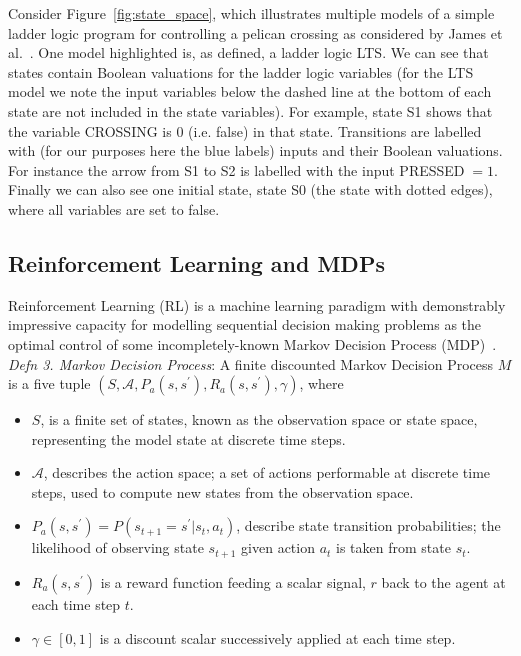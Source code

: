 \documentclass[runningheads]{llncs}
\begin{document}
Consider Figure~\ref{fig:state_space}, which illustrates multiple models of a simple ladder logic program for controlling a pelican crossing as considered by James et al.~\cite{james2013verification}. One model highlighted is, as defined, a ladder logic LTS. We can see that states contain Boolean valuations for the ladder logic variables (for the LTS model we note the input variables below the dashed line at the bottom of each state are not included in the state variables). For example, state S1 shows that the variable CROSSING is $0$ (i.e. false) in that state. Transitions are labelled with (for our purposes here the blue labels) inputs and their Boolean valuations. For instance the arrow from S1 to S2 is labelled with the input PRESSED$\;=1$. Finally we can also see one initial state, state S0 (the state with dotted edges), where all variables are set to false.

\subsection{Reinforcement Learning and MDPs}
Reinforcement Learning (RL) is a machine learning paradigm with demonstrably impressive capacity for modelling sequential decision making problems as the optimal control of some incompletely-known Markov Decision Process (MDP)~\cite{sutton2018reinforcement}. 
\textit{Defn 3. Markov Decision Process}: A finite discounted Markov Decision Process $M$ is a five tuple $(S,\mathcal{A},P_a(s,s^\prime), R_a(s,s^\prime),\gamma)$, where 
\begin{itemize}
	\item $S$, is a finite set of states, known as the observation space or state space, representing the model state at discrete time steps.
	\item $\mathcal{A}$, describes the action space; a set of actions performable at discrete time steps, used to compute new states from the observation space.
	\item $P_a(s,s^\prime) = P(s_{t+1} = s^\prime | s_t, a_t)$, describe state transition probabilities; the likelihood of observing state $s_{t+1}$ given action $a_t$ is taken from state $s_t$.
	\item $R_a(s,s^\prime)$ is a reward function feeding a scalar signal, $r$ back to the agent at each time step $t$. 
	\item $\gamma \in [0,1]$ is a discount scalar successively applied at each time step.
\end{itemize}

\end{document}
